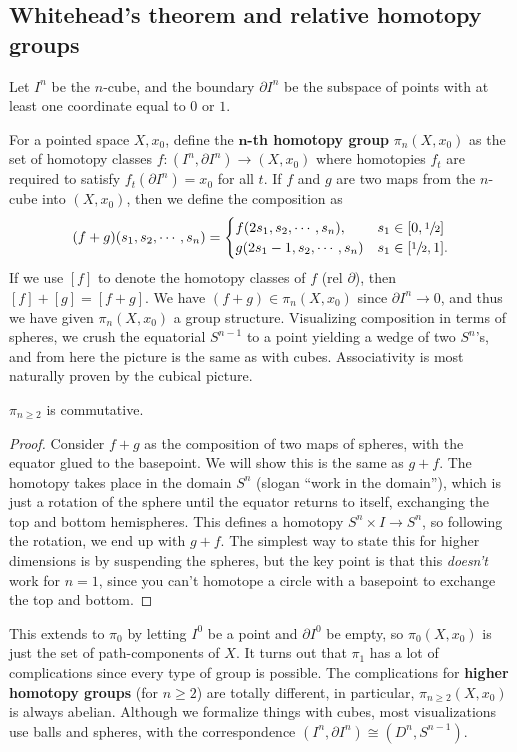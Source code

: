 \subsection{Whitehead's theorem and relative homotopy groups}
Let $I^n $ be the $n$-cube, and the boundary $\partial I^n $ be the subspace of points with at least one coordinate equal to $0$ or $1$. 
\begin{definition}
    For a pointed space $X,x_0$, define the $\mathbf n$\textbf{-th homotopy group} $\pi_n (X,x_0)$ as the set of homotopy classes $f \colon (I^n ,\partial I^n ) \to (X,x_0)$ where homotopies $f_t$ are required to satisfy $f_t(\partial I^n )=x_0$ for all $t$. If $f$ and $g$ are two maps from the $n$-cube into $(X,x_0)$, then we define the composition as \[
        (f+g)(s_1,s_2,\cdots ,s_n )=
        \begin{cases}
            f(2s_1,s_2,\cdots ,s_n ),\quad & s_1\in [0,\sfrac{1}{2}]\\
            g(2s_1-1,s_2,\cdots ,s_n )&s_1\in [\sfrac{1}{2}, 1].
        \end{cases}
    \] 
    If we use $[f]$ to denote the homotopy classes of $f$ (rel $\partial $), then $[f]+[g]=[f+g]$. We have $(f+g)\in \pi_n (X,x_0)$ since $\partial I^n \to 0$, and thus we have given $\pi_n (X,x_0)$ a group structure. Visualizing composition in terms of spheres, we crush the equatorial $S^{n-1}$ to a point yielding a wedge of two $S^n $'s, and from here the picture is the same as with cubes. Associativity is most naturally proven by the cubical picture.
\end{definition}
\begin{theorem}
    $\pi_{n\geq 2} $ is commutative.
\end{theorem}
\begin{proof}
    Consider $f+g$ as the composition of two maps of spheres, with the equator glued to the basepoint. We will show this is the same as $g+f$. The homotopy takes place in the domain $S^n $ (slogan ``work in the domain''), which is just a rotation of the sphere until the equator returns to itself, exchanging the top and bottom hemispheres. This defines a homotopy $S^n \times I\to S^n $, so following the rotation, we end up with $g+f$. The simplest way to state this for higher dimensions is by suspending the spheres, but the key point is that this \emph{doesn't} work for $n=1$, since you can't homotope a circle with a basepoint to exchange the top and bottom.
\end{proof}
This extends to $\pi_0$ by letting $I^0$ be a point and $\partial I^0$ be empty, so $\pi_0(X,x_0)$ is just the set of path-components of $X$. It turns out that $\pi_1$ has a lot of complications since every type of group is possible. The complications for \textbf{higher homotopy groups} (for $n\geq 2$) are totally different, in particular, $\pi_{n\geq 2}(X,x_0)$ is always abelian. Although we formalize things with cubes, most visualizations use balls and spheres, with the correspondence $(I^n ,\partial I^n )\cong (D^n ,S^{n-1})$.
